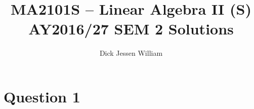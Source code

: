 \documentclass[12pt,a4paper]{article}
\author{Dick Jessen William}
\title{MA2101S -- Linear Algebra II (S) \\ AY2016/27 SEM 2 Solutions}
\begin{document}
	
	\maketitle
	
	\section*{Question 1}
	
\end{document}
